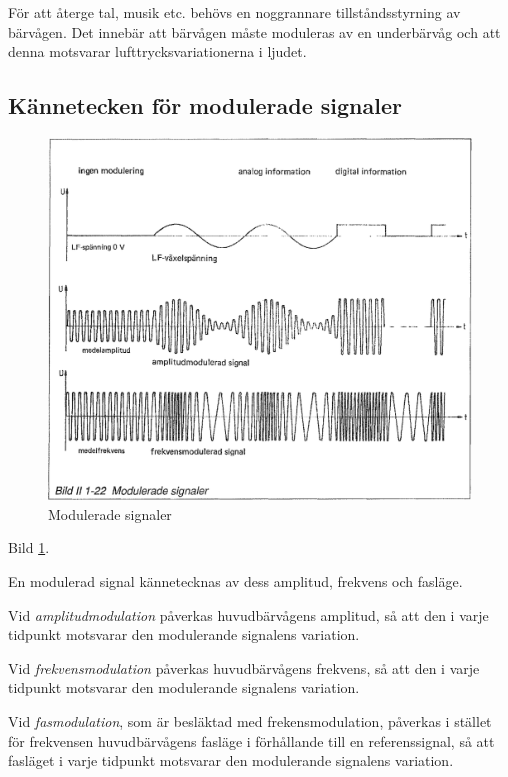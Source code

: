För att återge tal, musik etc. behövs en noggrannare tillståndsstyrning av
bärvågen. Det innebär att bärvågen måste moduleras av en underbärvåg och att
denna motsvarar lufttrycksvariationerna i ljudet.

\subsection{Kännetecken för modulerade signaler}

\begin{figure}
\includegraphics[width=\textwidth]{images/bild_2_1-22}
\caption{Modulerade signaler}
\label{fig:BildII1-22}
\end{figure}

Bild \ref{fig:BildII1-22}.

En modulerad signal kännetecknas av dess amplitud, frekvens och fasläge.

Vid \emph{amplitudmodulation} påverkas huvudbärvågens amplitud, så att den i
varje tidpunkt motsvarar den modulerande signalens variation.

Vid \emph{frekvensmodulation} påverkas huvudbärvågens frekvens, så att den i
varje tidpunkt motsvarar den modulerande signalens variation.

Vid \emph{fasmodulation}, som är besläktad med frekensmodulation, påverkas i
stället för frekvensen huvudbärvågens fasläge i förhållande till en
referenssignal, så att fasläget i varje tidpunkt motsvarar den modulerande
signalens variation.

